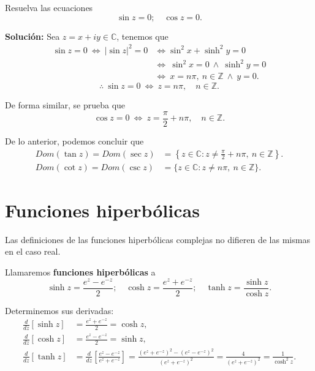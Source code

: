 \begin{ejemplo}
Resuelva las ecuaciones 
$$\sin z = 0; \quad \cos z = 0.$$

\textbf{Solución:} Sea $z = x+iy \in \mathbb{C}$, tenemos que
\begin{align*}
\sin z = 0 ~\Leftrightarrow~ |\sin z|^2 = 0 &\Leftrightarrow \sin^2 x + \sinh^2 y = 0 \\
&\Leftrightarrow~ \sin^2 x = 0 ~\wedge~ \sinh^2 y = 0 \\
 &\Leftrightarrow~  x = n\pi, ~ n \in \mathbb{Z} ~\wedge~ y = 0.
\end{align*}
$$\therefore ~ \sin z = 0 ~\Leftrightarrow~ z = n\pi, \quad n \in \mathbb{Z}.$$

De forma similar, se prueba que 
$$\cos z = 0 ~\Leftrightarrow~ z = \frac{\pi}{2} + n \pi, \quad n \in \mathbb{Z}.$$ 

\end{ejemplo}

De lo anterior, podemos concluir que
\begin{align*}
Dom(\tan z)= Dom(\sec z) &= \left\{z \in \mathbb{C}: z \neq \frac{\pi}{2} + n \pi, ~ n \in \mathbb{Z}  \right\}.\\
Dom(\cot z) = Dom( \csc z) &= \{z \in \mathbb{C}: z \neq n\pi, ~ n \in \mathbb{Z} \}.
\end{align*}

\section{Funciones hiperbólicas}

Las definiciones de las funciones hiperbólicas complejas no difieren de las mismas en el caso real.

\begin{defi}
Llamaremos \textbf{funciones hiperbólicas} a 
\begin{equation*}
\sinh z = \frac{e^z-e^{-z}}{2}; \quad \cosh z = \frac{e^z + e^{-z}}{2}; \quad \tanh z = \frac{\sinh z}{\cosh z}.
\end{equation*}
\end{defi}

Determinemos sus derivadas:
\begin{align*}
\frac{d}{dz}[\sinh z] &= \frac{e^z + e^{-z}}{2} = \cosh z, \\
\frac{d}{dz} [\cosh z] &= \frac{e^z - e^{-z}}{2} = \sinh z, \\
\frac{d}{dz} [\tanh z] &=  \frac{d}{dz}\left[ \frac{e^z - e^{-z}}{e^z + e^{-z}} \right] =  \frac{(e^z + e^{-z})^2 - (e^z - e^{-z})^2}{(e^z + e^{-z})^2} = \frac{4}{(e^z + e^{-z})^2} = \frac{1}{\cosh^2 z}.
\end{align*}

